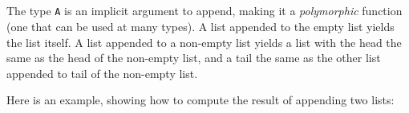 \begin{fence}
\begin{code}%
\>[0]\AgdaSpace{}%
\AgdaSpace{}%
\AgdaOperator{\AgdaFunction{\AgdaUnderscore{}++\AgdaUnderscore{}}}\<%
\\
%
\\[\AgdaEmptyExtraSkip]%
\>[0]\AgdaOperator{\AgdaFunction{\AgdaUnderscore{}++\AgdaUnderscore{}}}\AgdaSpace{}%
\AgdaSymbol{:}\AgdaSpace{}%
\AgdaSpace{}%
\AgdaSymbol{\{}\AgdaSpace{}%
\AgdaSymbol{:}\AgdaSpace{}%
\AgdaSymbol{\}}\AgdaSpace{}%
\AgdaSpace{}%
\AgdaSpace{}%
\AgdaSpace{}%
\AgdaSpace{}%
\AgdaSpace{}%
\AgdaSpace{}%
\AgdaSpace{}%
\AgdaSpace{}%
\<%
\\
\>[0]\AgdaInductiveConstructor{[]}%
\>[9]\AgdaOperator{\AgdaFunction{++}}\AgdaSpace{}%
%
\>[16]\AgdaSymbol{=}%
\>[19]\<%
\\
\>[0]\AgdaSymbol{(}\AgdaSpace{}%
\AgdaSpace{}%
\AgdaSymbol{)}\AgdaSpace{}%
\AgdaOperator{\AgdaFunction{++}}\AgdaSpace{}%
%
\>[16]\AgdaSymbol{=}%
\>[19]\AgdaSpace{}%
\AgdaSpace{}%
\AgdaSymbol{(}\AgdaSpace{}%
\AgdaOperator{\AgdaFunction{++}}\AgdaSpace{}%
\AgdaSymbol{)}\<%
\end{code}
\end{fence}

The type \texttt{A} is an implicit argument to append, making it a
\emph{polymorphic} function (one that can be used at many types). A list
appended to the empty list yields the list itself. A list appended to a
non-empty list yields a list with the head the same as the head of the
non-empty list, and a tail the same as the other list appended to tail
of the non-empty list.

Here is an example, showing how to compute the result of appending two
lists:

